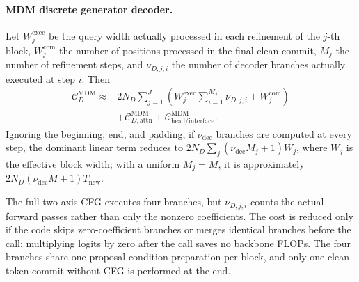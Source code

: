\paragraph{MDM discrete generator decoder.}
Let $W_j^{\mathrm{exec}}$ be the query width actually processed in each refinement of the $j$-th block, $W_j^{\mathrm{com}}$ the number of positions processed in the final clean commit, $M_j$ the number of refinement steps, and $\nu_{D,j,i}$ the number of decoder branches actually executed at step $i$. Then
\begin{equation}
\begin{aligned}
    \mathcal C_D^{\mathrm{MDM}}
    \approx{}&2N_D\sum_{j=1}^{J}
       \left(W_j^{\mathrm{exec}}\sum_{i=1}^{M_j}\nu_{D,j,i}
             +W_j^{\mathrm{com}}\right)\\
       &+\mathcal C_{D,\mathrm{attn}}^{\mathrm{MDM}}
        +\mathcal C_{\mathrm{head/interface}}^{\mathrm{MDM}}.
\end{aligned}
\label{eq:app-cost-mdm-infer}
\end{equation}
Ignoring the beginning, end, and padding, if $\nu_{\mathrm{dec}}$ branches are computed at every step, the dominant linear term reduces to $2N_D\sum_j(\nu_{\mathrm{dec}}M_j+1)W_j$, where $W_j$ is the effective block width; with a uniform $M_j=M$, it is approximately $2N_D(\nu_{\mathrm{dec}}M+1)T_{\mathrm{new}}$.

The full two-axis CFG executes four branches, but $\nu_{D,j,i}$ counts the actual forward passes rather than only the nonzero coefficients. The cost is reduced only if the code skips zero-coefficient branches or merges identical branches before the call; multiplying logits by zero after the call saves no backbone FLOPs. The four branches share one proposal condition preparation per block, and only one clean-token commit without CFG is performed at the end.


